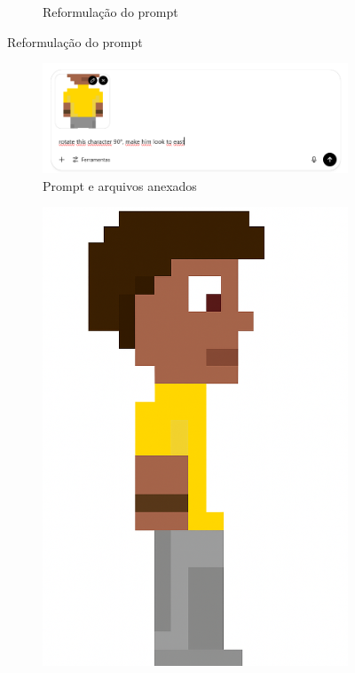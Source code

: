 \begin{figure}[htbp]
\begin{subfigure}{0.75\linewidth}
        \caption{\small Reformulação do prompt}
        \label{fig:chatGPT1c}
    \end{subfigure}
\end{figure}

\begin{figure}[htbp]
    \centering
    \caption{\small Processo da utilização 2 do ChatGPTem julho/2025}
    \label{fig:chatGPT2}

    \begin{subfigure}{0.75\linewidth}
        \includegraphics[width=1\linewidth]{figs/chatGPT/visao_lateral/tela1.PNG}
        \caption{\small Prompt e arquivos anexados}
        \label{fig:chatGPT2a}
    \end{subfigure}
    \begin{subfigure}{0.2\linewidth}
        \includegraphics[width=1\linewidth]{figs/chatGPT/visao_lateral/res1.png}

\end{subfigure}
\end{figure}
